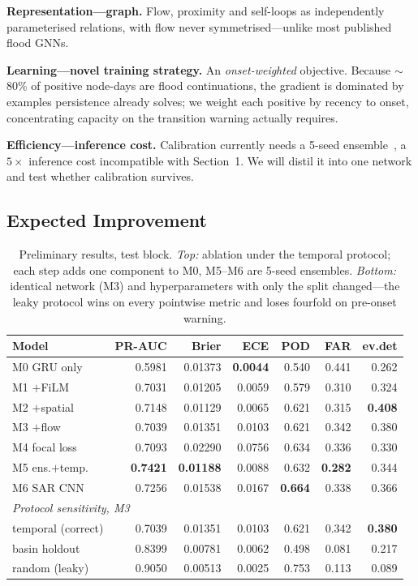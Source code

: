 \documentclass[sigconf]{acmart}
\begin{document}
\textbf{Representation---graph.} Flow, proximity and self-loops as independently parameterised relations, with flow never symmetrised---unlike most published flood GNNs.

\textbf{Learning---novel training strategy.} An \emph{onset-weighted} objective. Because $\sim$80\% of positive node-days are flood continuations, the gradient is dominated by examples persistence already solves; we weight each positive by recency to onset, concentrating capacity on the transition warning actually requires.

\textbf{Efficiency---inference cost.} Calibration currently needs a 5-seed ensemble~\cite{Lakshminarayanan2017}, a $5\times$ inference cost incompatible with Section~1. We will distil it into one network and test whether calibration survives.

\subsection{Expected Improvement}
\label{sec:improve}

\begin{table}[!t]
\caption{Preliminary results, test block. \emph{Top:} ablation under the temporal protocol; each step adds one component to M0, M5--M6 are 5-seed ensembles. \emph{Bottom:} identical network (M3) and hyperparameters with only the split changed---the leaky protocol wins on every pointwise metric and loses fourfold on pre-onset warning.}
\label{tab:ladder}
\scriptsize
\setlength{\tabcolsep}{3pt}
\begin{tabular}{lrrrrrr}
\toprule
Model & PR-AUC & Brier & ECE & POD & FAR & ev.det \\
\midrule
M0 GRU only     & 0.5981 & 0.01373 & \textbf{0.0044} & 0.540 & 0.441 & 0.262 \\
M1 $+$FiLM      & 0.7031 & 0.01205 & 0.0059 & 0.579 & 0.310 & 0.324 \\
M2 $+$spatial   & 0.7148 & 0.01129 & 0.0065 & 0.621 & 0.315 & \textbf{0.408} \\
M3 $+$flow      & 0.7039 & 0.01351 & 0.0103 & 0.621 & 0.342 & 0.380 \\
M4 focal loss   & 0.7093 & 0.02290 & 0.0756 & 0.634 & 0.336 & 0.330 \\
M5 ens.$+$temp. & \textbf{0.7421} & \textbf{0.01188} & 0.0088 & 0.632 & \textbf{0.282} & 0.344 \\
M6 SAR CNN      & 0.7256 & 0.01538 & 0.0167 & \textbf{0.664} & 0.338 & 0.366 \\
\midrule
\multicolumn{7}{l}{\emph{Protocol sensitivity, M3}} \\
\quad temporal (correct) & 0.7039 & 0.01351 & 0.0103 & 0.621 & 0.342 & \textbf{0.380} \\
\quad basin holdout      & 0.8399 & 0.00781 & 0.0062 & 0.498 & 0.081 & 0.217 \\
\quad random (leaky)     & 0.9050 & 0.00513 & 0.0025 & 0.753 & 0.113 & 0.089 \\
\bottomrule
\end{tabular}
\end{table}
\end{document}
